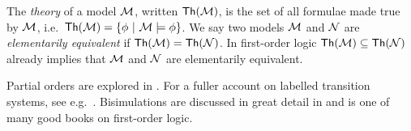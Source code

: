The \emph{theory} of a model $\mathcal{M}$, written $\mathsf{Th}(\mathcal{M})$, is
the set of all formulae made true by $\mathcal{M}$, i.e.~$\mathsf{Th}(\mathcal{M})
= \{\phi\ |\ \mathcal{M}\models \phi\}$. We say two models $\mathcal{M}$ and
$\mathcal{N}$ are \emph{elementarily equivalent} if $\mathsf{Th}(\mathcal{M}) =
\mathsf{Th}(\mathcal{N})$. In first-order logic $\mathsf{Th}(\mathcal{M}) \subseteq
\mathsf{Th}(\mathcal{N})$ already implies that $\mathcal{M}$ and $\mathcal{N}$ are
elementarily equivalent.

 Partial orders are explored in \cite{DaveyBA:intlatao}. For a
fuller account on labelled transition systems, see
e.g.~\cite{SassoneV:modcontac,HennessyM:Algtheop}. Bisimulations are
discussed in great detail in \cite{SangiorgiD:intbisac} and
\cite{EndertonHB:matinttl} is one of many good books on first-order
logic.

